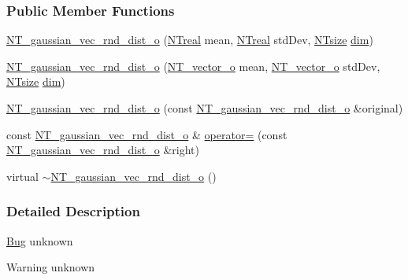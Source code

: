 \subsubsection*{Public Member Functions}
\begin{DoxyCompactItemize}
\item 
\hyperlink{class_n_t__gaussian__vec__rnd__dist__o_af9ee8c2199e9de3bd80cd78c7c9f8a89}{NT\_\-gaussian\_\-vec\_\-rnd\_\-dist\_\-o} (\hyperlink{nt__types_8h_a814a97893e9deb1eedcc7604529ba80d}{NTreal} mean, \hyperlink{nt__types_8h_a814a97893e9deb1eedcc7604529ba80d}{NTreal} stdDev, \hyperlink{nt__types_8h_a06c124f2e4469769b58230253ce0560b}{NTsize} \hyperlink{class_n_t__vec__rnd__dist__o_a708a77a7d135e0dec8201b36c0a55fa2}{dim})
\item 
\hyperlink{class_n_t__gaussian__vec__rnd__dist__o_a8f143bc89cd063d884c1b1950a275f54}{NT\_\-gaussian\_\-vec\_\-rnd\_\-dist\_\-o} (\hyperlink{class_n_t__vector__o}{NT\_\-vector\_\-o} mean, \hyperlink{class_n_t__vector__o}{NT\_\-vector\_\-o} stdDev, \hyperlink{nt__types_8h_a06c124f2e4469769b58230253ce0560b}{NTsize} \hyperlink{class_n_t__vec__rnd__dist__o_a708a77a7d135e0dec8201b36c0a55fa2}{dim})
\item 
\hyperlink{class_n_t__gaussian__vec__rnd__dist__o_a13f156293abeecc68afaff34ae011474}{NT\_\-gaussian\_\-vec\_\-rnd\_\-dist\_\-o} (const \hyperlink{class_n_t__gaussian__vec__rnd__dist__o}{NT\_\-gaussian\_\-vec\_\-rnd\_\-dist\_\-o} \&original)
\item 
const \hyperlink{class_n_t__gaussian__vec__rnd__dist__o}{NT\_\-gaussian\_\-vec\_\-rnd\_\-dist\_\-o} \& \hyperlink{class_n_t__gaussian__vec__rnd__dist__o_ab1490ea9ffe9d3140d9b1460e1841d10}{operator=} (const \hyperlink{class_n_t__gaussian__vec__rnd__dist__o}{NT\_\-gaussian\_\-vec\_\-rnd\_\-dist\_\-o} \&right)
\item 
virtual \hyperlink{class_n_t__gaussian__vec__rnd__dist__o_af546f4ec054fa66c15ca3eb5c992f8ee}{$\sim$NT\_\-gaussian\_\-vec\_\-rnd\_\-dist\_\-o} ()
\end{DoxyCompactItemize}


\subsubsection{Detailed Description}
\begin{Desc}
\item[\hyperlink{bug__bug000097}{Bug}]unknown \end{Desc}
\begin{DoxyWarning}{Warning}
unknown 
\end{DoxyWarning}


